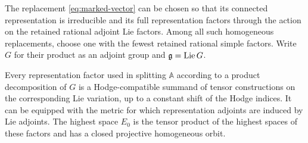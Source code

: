 \begin{lemma}\label{lem:marked-replacement}
The replacement \eqref{eq:marked-vector} can be chosen so that its
connected representation is irreducible and its full representation
factors through the action on the retained rational adjoint Lie
factors.  Among all such homogeneous replacements, choose one with
the fewest retained rational simple factors.  Write $G$ for their
product as an adjoint group and $\mathfrak g=\operatorname{Lie} G$.

Every representation factor used in splitting $\mathbb A$ according
to a product decomposition of $G$ is a Hodge-compatible summand of
tensor constructions on the corresponding Lie variation, up to a
constant shift of the Hodge indices.  It can be equipped with the
metric for which representation adjoints are induced by Lie
adjoints.  The highest space $E_0$ is the tensor product of the
highest spaces of these factors and has a closed projective
homogeneous orbit.
\end{lemma}

